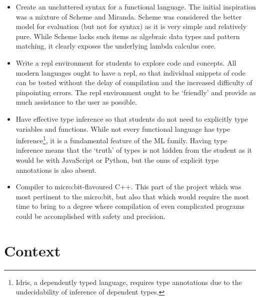 \documentclass[12pt, a4paper]{report}
\begin{document}
\begin{itemize}
    \item Create an uncluttered syntax for a functional language. The initial inspiration was a
        mixture of Scheme and Miranda. Scheme was considered the better model for evaluation (but
        not for syntax) as it is very simple and relatively pure. While Scheme lacks such items as algebraic data types
        and pattern matching, it clearly exposes the underlying lambda calculus core.
    \item Write a repl environment for students to explore code and concepts. All modern languages
        ought to have a repl, so that individual snippets of code can be tested without the delay of
        compilation and the increased difficulty of pinpointing errors. The repl environment ought
        to be `friendly' and provide as much assistance to the user as possible. 
    \item Have effective type inference so that students do not need to explicitly type variables
        and functions. While not every functional language has type inference\footnote{Idris, a
        dependently typed language, requires type annotations due to the undecidability of inference of
        dependent types.}, it is a fundamental feature of the ML family. Having type inference means
        that the `truth' of types is not hidden from the student as it would be with JavaScript or
        Python, but the onus of explicit type annotations is also absent.
    \item Compiler to micro:bit-flavoured C++. This part of the project which was most
        pertinent to the micro:bit, but also that which would require the most time to bring to a
        degree where compilation of even complicated programs could be accomplished with safety and
        precision. 
\end{itemize}

\chapter{Context} 
\end{document}
